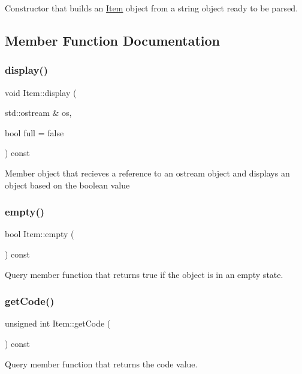 Constructor that builds an \mbox{\hyperlink{classItem}{Item}} object from a string object ready to be parsed. 

\subsection{Member Function Documentation}
\mbox{\label{classItem_a9433e55e0165564bbbdb77bd01853728}} 
\subsubsection{\texorpdfstring{display()}{display()}}
{\footnotesize\ttfamily void Item\+::display (\begin{DoxyParamCaption}\item[{std\+::ostream \&}]{os,  }\item[{bool}]{full = {\ttfamily false} }\end{DoxyParamCaption}) const}

Member object that recieves a reference to an ostream object and displays an object based on the boolean value \mbox{\label{classItem_a8a1745ce42e5695d5c63c62bd5be7d8e}} 
\subsubsection{\texorpdfstring{empty()}{empty()}}
{\footnotesize\ttfamily bool Item\+::empty (\begin{DoxyParamCaption}{ }\end{DoxyParamCaption}) const}

Query member function that returns true if the object is in an empty state. \mbox{\label{classItem_a359a6949cfad6cfb7f7d85e132525056}} 
\subsubsection{\texorpdfstring{get\+Code()}{getCode()}}
{\footnotesize\ttfamily unsigned int Item\+::get\+Code (\begin{DoxyParamCaption}{ }\end{DoxyParamCaption}) const}

Query member function that returns the code value. \mbox{\label{classItem_a67903e1bcdd09d0857295a33b5fbeb6b}} 
